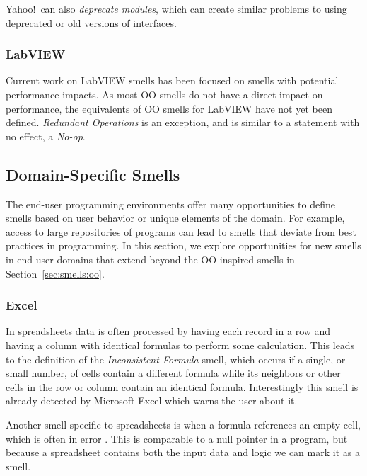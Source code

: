 \documentclass[10pt,conference,compsocconf]{IEEEtran}
\begin{document}
Yahoo!\ can also \emph{deprecate modules}, which can create similar problems to using deprecated or old versions of interfaces.

\subsubsection{LabVIEW}

Current work on LabVIEW smells has been focused on smells with potential performance impacts.
As most OO smells do not have a direct impact on performance, the equivalents of OO smells for LabVIEW have not yet been defined.
\emph{Redundant Operations} is an exception, and is similar to a statement with no effect, a \emph{No-op}.

\subsection{Domain-Specific Smells}
\label{sec:smells:domain}
The end-user programming environments offer many opportunities to define smells based on user behavior or unique elements of the domain. For example, access to large repositories of programs can lead to smells that deviate from best practices in programming. In this section, we explore opportunities for new smells in end-user domains that extend beyond the OO-inspired smells in Section~\ref{sec:smells:oo}. 

\subsubsection{Excel}

In spreadsheets data is often processed by having each record in a row and having a column with identical formulas to perform some calculation.
This leads to the definition of the \emph{Inconsistent Formula} smell, which occurs if a single, or small number, of cells contain a different formula while its neighbors or other cells in the row or column contain an identical formula.
Interestingly this smell is already detected by Microsoft Excel which warns the user about it.

Another smell specific to spreadsheets is when a formula references an empty cell, which is often in error \cite{cunha2012towards}.
This is comparable to a null pointer in a program, but because a spreadsheet contains both the input data and logic we can mark it as a smell.
\end{document}
